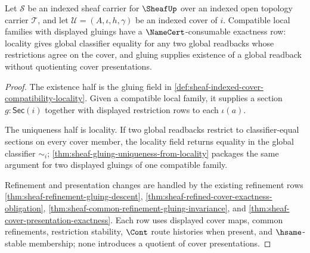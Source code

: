 \begin{theorem}
\label{thm:sheaf-root-unblock-locality-gluing-obligation}
Let $\mathcal{S}$ be an indexed sheaf carrier for $\SheafUp$ over an indexed open topology carrier $\mathcal{T}$, and let $\mathcal{U}=(A,\iota,h,\gamma)$ be an indexed cover of $i$. Compatible local families with displayed gluings have a $\NameCert$-consumable exactness row: locality gives global classifier equality for any two global readbacks whose restrictions agree on the cover, and gluing supplies existence of a global readback without quotienting cover presentations.
\end{theorem}
\begin{proof}
The existence half is the gluing field in \autoref{def:sheaf-indexed-cover-compatibility-locality}. Given a compatible local family, it supplies a section $g:\mathsf{Sec}(i)$ together with displayed restriction rows to each $\iota(a)$.

The uniqueness half is locality. If two global readbacks restrict to classifier-equal sections on every cover member, the locality field returns equality in the global classifier $\sim_i$; \autoref{thm:sheaf-gluing-uniqueness-from-locality} packages the same argument for two displayed gluings of one compatible family.

Refinement and presentation changes are handled by the existing refinement rows \autoref{thm:sheaf-refinement-gluing-descent}, \autoref{thm:sheaf-refined-cover-exactness-obligation}, \autoref{thm:sheaf-common-refinement-gluing-invariance}, and \autoref{thm:sheaf-cover-presentation-exactness}. Each row uses displayed cover maps, common refinements, restriction stability, $\Cont$ route histories when present, and $\hsame$-stable membership; none introduces a quotient of cover presentations.
\end{proof}

